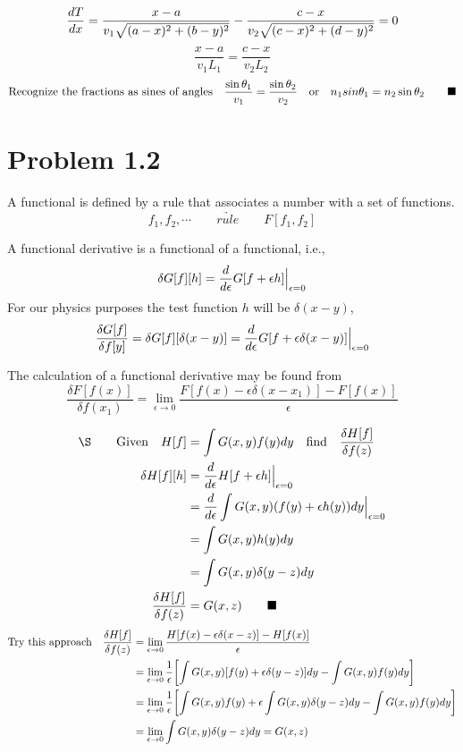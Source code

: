 \documentclass{memoir}
\begin{document}
\[\dv {T} {x} = \frac{x-a}{v_1\sqrt {(a-x)^2+(b-y)^2}} - \frac{c-x}{v_2\sqrt {(c-x)^2+(d-y)^2}}=0  \]
\[\frac{x-a}{v_1 L_1} = \frac{c-x}{v_2 L_2}  \]
\[\qq*{Recognize the fractions as sines of angles} \frac{\sin \theta_1}{v_1} = \frac{\sin \theta_2}{v_2} \qor n_1 sin \theta_1 = n_2 \sin \theta_2\qquad \blacksquare\]




\section*{Problem 1.2}

A functional is defined by a rule that associates a number with a set of functions.
\[f_1, f_2, \cdots\qquad\underrightarrow{rule}\qquad F[f_1, f_2] \]

A functional derivative is a functional of a functional, i.e.,
\[\var{G[f][h]}=\dv{\epsilon}G[f+\epsilon h]\Big\vert_{\epsilon=0}\]
For our physics purposes the test function $h$ will be $\delta(x-y)$,
\[\fdv{G[f]}{f[y]}=\var{ G[f][\delta(x-y)]}=\dv{\epsilon}G[f+\epsilon\delta(x-y)]\Big\vert_{\epsilon=0}\]

The calculation of a functional derivative may be found from
\[\frac{\delta F[f(x)]}{\delta f(x_1)}=\lim_{\epsilon\to 0}\frac{F[f(x)-\epsilon\delta(x-x_1)]-F[f(x)]}{\epsilon}    \]


\begin{align*}
    \qq*{\S}\qq{Given}H[f]          & =\int G(x,y)f(y)dy\qq{find}\frac{\delta H[f]}{\delta f(z)}                  \\
    \delta H[f][h]                  & =\frac{d}{d\epsilon}H[f+\epsilon h]\Big\vert_{\epsilon=0}                   \\
                                    & =\frac{d}{d\epsilon}\int G(x,y)(f(y)+\epsilon h(y))dy\Big\vert_{\epsilon=0} \\
                                    & =\int G(x,y)h(y)dy                                                          \\
                                    & =\int G(x,y)\delta(y-z)dy                                                   \\
    \frac{\delta H[f]}{\delta f(z)} & =G(x,z) \qquad \blacksquare
\end{align*}
\begin{align*}
    \qq*{Try this approach}\fdv{H[f]}{f(z)}&=\lim_{\epsilon\to 0}\frac{H[f(x)-\epsilon\delta(x-z)]-H[f(x)]}{\epsilon} \\
    &=\lim_{\epsilon\to 0}\frac{1}{\epsilon}\bqty{\int G(x,y)\bqty{f(y)+\epsilon\delta(y-z)}dy-\int G(x,y)f(y)dy}\\
    &=\lim_{\epsilon\to 0}\frac{1}{\epsilon}\bqty{\int G(x,y)f(y)+\epsilon\int G(x,y)\delta(y-z)dy-\int G(x,y)f(y)dy}\\
    &=\lim_{\epsilon\to 0}\int G(x,y)\delta(y-z)dy =G(x,z)\\
\end{align*}
\end{document}
